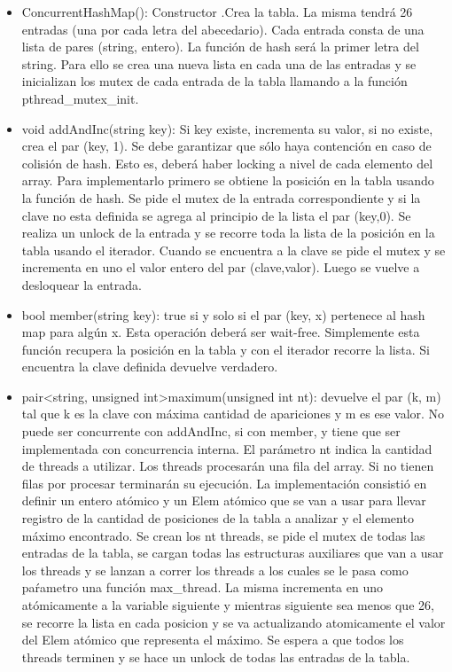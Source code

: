 \documentclass[a4paper]{article}
\begin{document}
{\begin{itemize}
\item ConcurrentHashMap(): Constructor .Crea la tabla. La misma tendrá 26 entradas (una por
cada letra del abecedario). Cada entrada consta de una lista de pares (string, entero). La
función de hash será la primer letra del string. Para ello se crea una nueva lista en cada una de las entradas y se inicializan los mutex de cada entrada de la tabla llamando a la función pthread_mutex_init.\blindtext
\item void addAndInc(string key): Si key existe, incrementa su valor, si no existe, crea el par
(key, 1). Se debe garantizar que sólo haya contención en caso de colisión de hash. Esto es,
deberá haber locking a nivel de cada elemento del array. Para implementarlo primero se obtiene la posición en la tabla usando la función de hash. Se pide el mutex de la entrada correspondiente y si la clave no esta definida se agrega al principio de la lista el par (key,0). Se realiza un unlock de la entrada y se recorre toda la lista de la posición en la tabla usando el iterador. Cuando se encuentra a la clave se pide el mutex y se incrementa en uno el valor entero del par (clave,valor). Luego se vuelve a desloquear la entrada.\blindtext
\item bool member(string key): true si y solo si el par (key, x) pertenece al hash map para algún
x. Esta operación deberá ser wait-free. Simplemente esta función recupera la posición en la tabla y con el iterador recorre la lista. Si encuentra la clave definida devuelve verdadero. 
\item pair<string, unsigned int>maximum(unsigned int nt): devuelve el par (k, m) tal que
k es la clave con máxima cantidad de apariciones y m es ese valor. No puede ser concurrente
con addAndInc, si con member, y tiene que ser implementada con concurrencia interna. El
parámetro nt indica la cantidad de threads a utilizar. Los threads procesarán una fila del
array. Si no tienen filas por procesar terminarán su ejecución. La implementación consistió en definir un entero atómico y un Elem atómico que se van a usar para llevar registro de la cantidad de posiciones de la tabla a analizar y el elemento máximo encontrado. Se crean los nt threads, se pide el mutex de todas las entradas de la tabla, se cargan todas las estructuras auxiliares que van a usar los threads y se lanzan a correr los threads a los cuales se le pasa como paŕametro una función max_thread. La misma incrementa en uno atómicamente a la variable siguiente y mientras siguiente sea menos que 26, se recorre la lista en cada posicion y se va actualizando atomicamente el valor del Elem atómico que representa el máximo. Se espera a que todos los threads terminen y se hace un unlock de todas las entradas de la tabla.


\end{itemize}}
\end{document}
